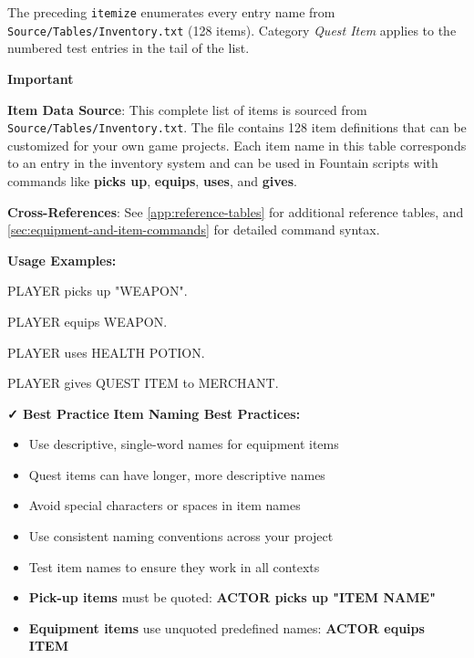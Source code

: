 \documentclass[11pt,letterpaper,oldstylefigures]{memoir}
\newcommand{\stagedir}[1]{#1\par\vspace{1\baselineskip}}
\newenvironment{FountainExample}
  {\begingroup
  \ttfamily\small
   \setlength{\parindent}{0pt}
  \setlength{\parskip}{0.5em}
  \allowdisplaybreaks
  \setlength{\displaywidowpenalty}{0}
  \setlength{\widowpenalty}{0}
  \setlength{\clubpenalty}{0}
  \setlength{\interlinepenalty}{0}
}
  {\endgroup}
\newenvironment{Important}
{\begingroup
\small
\setlength{\parindent}{0pt}
\setlength{\parskip}{0.5em}
\allowdisplaybreaks
\setlength{\displaywidowpenalty}{0}
\setlength{\widowpenalty}{0}
\setlength{\clubpenalty}{0}
\setlength{\interlinepenalty}{0}
\begin{tcolorbox}[
    colback=yellow!5,
    colframe=yellow!75!black,
    boxrule=0.5pt,
    arc=2pt,
    left=0.5em,
    right=0.5em,
    top=0.25em,
    bottom=0.25em
]
\textbf{Important}
\end{tcolorbox}\par
}
{\endgroup}
\newcommand{\fountain}[1]{\textbf{#1}}
\newcommand{\Phantasia}{{\irishfont Phantasia}}
\begin{document}
\begin{table}[htbp]
\centering
\caption{Complete Item List for \Phantasia{}}
\label{tab:complete-item-list}
\vspace{0.5\baselineskip}
\noindent\small The preceding \texttt{itemize} enumerates every entry name from \texttt{Source/Tables/Inventory.txt} (128 items). Category \emph{Quest Item} applies to the numbered test entries in the tail of the list.
\end{table}

\begin{Important}
\textbf{Item Data Source}: This complete list of items is sourced from \texttt{Source/Tables/Inventory.txt}. The file contains 128 item definitions that can be customized for your own game projects. Each item name in this table corresponds to an entry in the inventory system and can be used in Fountain scripts with commands like \fountain{picks up}, \fountain{equips}, \fountain{uses}, and \fountain{gives}.
\end{Important}

\textbf{Cross-References}: See \autoref{app:reference-tables} for additional reference tables, and \autoref{sec:equipment-and-item-commands} for detailed command syntax.

\textbf{Usage Examples:}
\begin{FountainExample}
\stagedir{PLAYER picks up "WEAPON".}
\stagedir{PLAYER equips WEAPON.}
\stagedir{PLAYER uses HEALTH POTION.}
\stagedir{PLAYER gives QUEST ITEM to MERCHANT.}
\end{FountainExample}

\textbf{✓ Best Practice}
\textbf{Item Naming Best Practices:}
\begin{itemize}
\item Use descriptive, single-word names for equipment items
\item Quest items can have longer, more descriptive names
\item Avoid special characters or spaces in item names
\item Use consistent naming conventions across your project
\item Test item names to ensure they work in all contexts
\item \textbf{Pick-up items} must be quoted: \fountain{ACTOR picks up "ITEM NAME"}
\item \textbf{Equipment items} use unquoted predefined names: \fountain{ACTOR equips ITEM}
\end{itemize}
\end{document}
